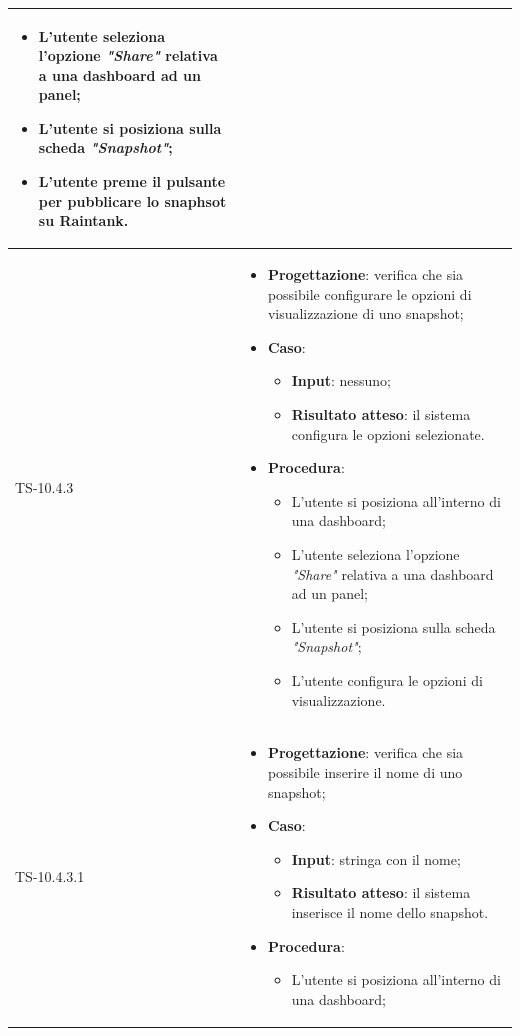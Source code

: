 \begin{longtable}{|C{2.5cm}|C{13cm}|}
\begin{itemize}
\begin{itemize}
		\item L'utente seleziona l'opzione \emph{"Share"} relativa a una dashboard ad un panel;
		\item L'utente si posiziona sulla scheda \emph{"Snapshot"};
		\item L'utente preme il pulsante per pubblicare lo snaphsot su Raintank.
	\end{itemize} 
\end{itemize}
	 \\
	\hline
	{TS-10.4.3} & 
\begin{itemize}
	\item \textbf{Progettazione}: verifica che sia possibile configurare le
	opzioni di visualizzazione di uno snapshot;
	\item \textbf{Caso}: 
	\begin{itemize}
		\item \textbf{Input}: nessuno;
		\item \textbf{Risultato atteso}: il sistema configura le opzioni selezionate.
	\end{itemize}
	\item \textbf{Procedura}:
	\begin{itemize}
		\item L'utente si posiziona all'interno di una dashboard;
		\item L'utente seleziona l'opzione \emph{"Share"} relativa a una dashboard ad un panel;
		\item L'utente si posiziona sulla scheda \emph{"Snapshot"};
		\item L'utente configura le opzioni di visualizzazione.
	\end{itemize} 
\end{itemize}
	\\
	\hline
	{TS-10.4.3.1} &
\begin{itemize}
	\item \textbf{Progettazione}: verifica che sia possibile inserire il nome
	di uno snapshot;
	\item \textbf{Caso}: 
	\begin{itemize}
		\item \textbf{Input}: stringa con il nome;
		\item \textbf{Risultato atteso}: il sistema inserisce il nome dello snapshot.
	\end{itemize}
	\item \textbf{Procedura}:
	\begin{itemize}
		\item L'utente si posiziona all'interno di una dashboard;

\end{itemize}
\end{itemize}
\end{longtable}
